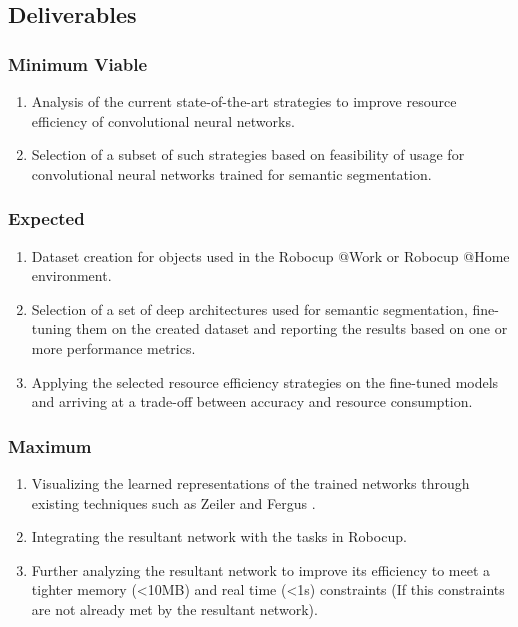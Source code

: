 \documentclass[a4paper,12pt]{article}
\begin{document}
\subsection{Deliverables}
\subsubsection{Minimum Viable}
	\begin{enumerate}
		\item Analysis of the current state-of-the-art strategies to improve resource efficiency of convolutional neural networks.
		\item Selection of a subset of such strategies based on feasibility of usage for convolutional neural networks trained for semantic segmentation.
	\end{enumerate}
\subsubsection{Expected}
	\begin{enumerate}
		\item Dataset creation for objects used in the Robocup @Work or Robocup @Home environment.
		\item Selection of a set of deep architectures used for semantic segmentation, fine-tuning them on the created dataset and reporting the results based on one or more performance metrics.
		\item Applying the selected resource efficiency strategies on the fine-tuned models and arriving at a trade-off between accuracy and resource consumption.
	\end{enumerate}
\subsubsection{Maximum}
	\begin{enumerate}
		\item Visualizing the learned representations of the trained networks through existing techniques such as Zeiler and Fergus \cite{14}.
		\item Integrating the resultant network with the tasks in Robocup.
		\item Further analyzing the resultant network to improve its efficiency to meet a tighter memory (<10MB) and real time (<1s) constraints (If this constraints are not already met by the resultant network).
	\end{enumerate}
\end{document}
